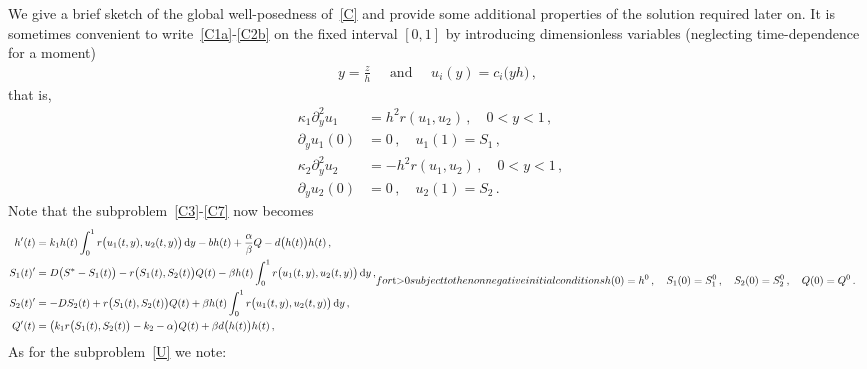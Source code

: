 \documentclass[reqno,11pt]{amsart}
\numberwithin{equation}{section}
\newcommand{\rd}{\mathrm{d}}
\begin{document}
We give a brief sketch of the global well-posedness of~\eqref{C} and provide some additional properties of the solution required later on. 
It is sometimes convenient to write~\eqref{C1a}-\eqref{C2b} on the fixed interval $[0,1]$ by introducing dimensionless variables  (neglecting time-dependence for a moment)
\begin{align}\label{dvar}
y=\frac{z}{h}\quad \text{ and }\quad u_i(y)=c_i\bigl(yh\bigr)\,,
\end{align}
that is,
\begin{subequations}\label{U}
\begin{align}
\kappa_1 \partial_{y}^2u_1&= h^2r(u_1,u_2)\,, \quad 0<y<1\,,\quad \label{BBB2}\\
\partial_{y}u_1(0)&=0\,,\quad u_1(1)=S_1\,, \label{BBB4}\\
\kappa_2 \partial_{y}^2u_2&= -h^2r(u_1,u_2)\,, \quad 0<y<1\,,\quad \label{BBB2x}\\
\partial_{y}u_2(0)&=0\,,\quad u_2(1)=S_2\,. \label{BBB4x}
\end{align}
\end{subequations}
Note that the subproblem~\eqref{C3}-\eqref{C7} now becomes
\begin{subequations}\label{UU}
\begin{align}
h'(t)&=k_1h(t)\int_0^{1}r\big(u_1(t,y),u_2(t,y)\big)\, \rd y-bh(t) +\frac{\alpha}{\beta} Q-d\big(h(t)\big)h(t)\,, \label{C3x}\\
S_1(t)'&=D\big(S^*-S_1(t)\big)-r\big(S_1(t),S_2(t)\big)Q(t)-\beta h(t)\int_0^{1} r\big(u_1(t,y),u_2(t,y)\big) \, \rd y \,, \label{C4ax}\\
S_2(t)'&=-DS_2(t)+r\big(S_1(t),S_2(t)\big)Q(t)+\beta h(t) \int_0^{1} r\big(u_1(t,y),u_2(t,y)\big)\, \rd y \,, \label{C4bx}\\
Q'(t)&= \big(k_1r\big(S_1(t),S_2(t)\big)-k_2-\alpha\big)Q(t)+\beta d\big(h(t)\big)h(t)\,, \label{C5x}
\end{align}
for $t>0$ subject to the nonnegative initial conditions
\begin{align}\label{C7x}
h(0)&=h^0\,,\quad S_1(0)=S_1^0\,,\quad S_2(0)=S_2^0\,,\quad Q(0)=Q^0 \,.
\end{align}
\end{subequations}
As for the subproblem~\eqref{U} we note:
\end{document}
